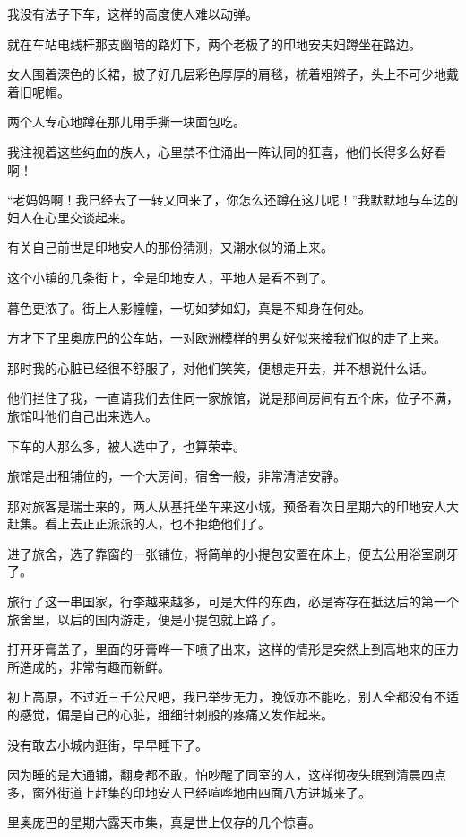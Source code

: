 \par 我没有法子下车，这样的高度使人难以动弹。
\par 就在车站电线杆那支幽暗的路灯下，两个老极了的印地安夫妇蹲坐在路边。
\par 女人围着深色的长裙，披了好几层彩色厚厚的肩毯，梳着粗辫子，头上不可少地戴着旧呢帽。
\par 两个人专心地蹲在那儿用手撕一块面包吃。
\par 我注视着这些纯血的族人，心里禁不住涌出一阵认同的狂喜，他们长得多么好看啊！
\par “老妈妈啊！我已经去了一转又回来了，你怎么还蹲在这儿呢！”我默默地与车边的妇人在心里交谈起来。
\par 有关自己前世是印地安人的那份猜测，又潮水似的涌上来。
\par 这个小镇的几条街上，全是印地安人，平地人是看不到了。
\par 暮色更浓了。街上人影幢幢，一切如梦如幻，真是不知身在何处。
\par 方才下了里奥庞巴的公车站，一对欧洲模样的男女好似来接我们似的走了上来。
\par 那时我的心脏已经很不舒服了，对他们笑笑，便想走开去，并不想说什么话。
\par 他们拦住了我，一直请我们去住同一家旅馆，说是那间房间有五个床，位子不满，旅馆叫他们自己出来选人。
\par 下车的人那么多，被人选中了，也算荣幸。
\par 旅馆是出租铺位的，一个大房间，宿舍一般，非常清洁安静。
\par 那对旅客是瑞士来的，两人从基托坐车来这小城，预备看次日星期六的印地安人大赶集。看上去正正派派的人，也不拒绝他们了。
\par 进了旅舍，选了靠窗的一张铺位，将简单的小提包安置在床上，便去公用浴室刷牙了。
\par 旅行了这一串国家，行李越来越多，可是大件的东西，必是寄存在抵达后的第一个旅舍里，以后的国内游走，便是小提包就上路了。
\par 打开牙膏盖子，里面的牙膏哗一下喷了出来，这样的情形是突然上到高地来的压力所造成的，非常有趣而新鲜。
\par 初上高原，不过近三千公尺吧，我已举步无力，晚饭亦不能吃，别人全都没有不适的感觉，偏是自己的心脏，细细针刺般的疼痛又发作起来。
\par 没有敢去小城内逛街，早早睡下了。
\par 因为睡的是大通铺，翻身都不敢，怕吵醒了同室的人，这样彻夜失眠到清晨四点多，窗外街道上赶集的印地安人已经喧哗地由四面八方进城来了。
\par 里奥庞巴的星期六露天市集，真是世上仅存的几个惊喜。
